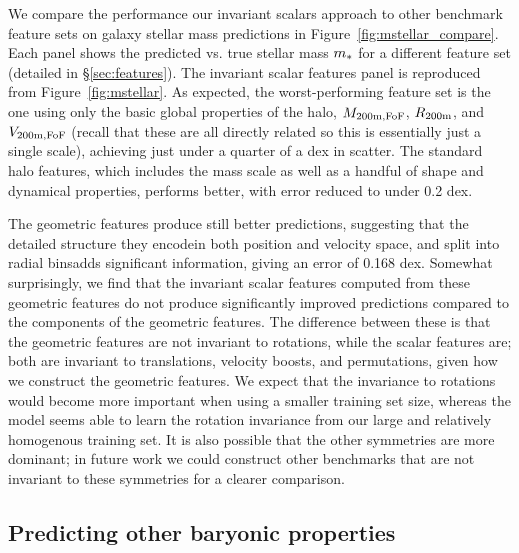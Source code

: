 We compare the performance our invariant scalars approach to other benchmark feature sets on galaxy stellar mass predictions in Figure~\ref{fig:mstellar_compare}.
Each panel shows the predicted vs. true stellar mass $m_*$ for a different feature set (detailed in \S\ref{sec:features}).
The invariant scalar features panel is reproduced from Figure~\ref{fig:mstellar}.
As expected, the worst-performing feature set is the one using only the basic global properties of the halo, $M_\mathrm{200m,FoF}$, $R_\mathrm{200m}$, and $V_\mathrm{200m,FoF}$ (recall that these are all directly related so this is essentially just a single scale), achieving just under a quarter of a dex in scatter.
The standard halo features, which includes the mass scale as well as a handful of shape and dynamical properties, performs better, with error reduced to under 0.2 dex. 

The geometric features produce still better predictions, suggesting that the detailed structure they encode{\emdash}in both position and velocity space, and split into radial bins{\emdash}adds significant information, giving an error of 0.168 dex.
Somewhat surprisingly, we find that the invariant scalar features computed from these geometric features do not produce significantly improved predictions compared to the components of the geometric features.
The difference between these is that the geometric features are not invariant to rotations, while the scalar features are; both are invariant to translations, velocity boosts, and permutations, given how we construct the geometric features.
We expect that the invariance to rotations would become more important when using a smaller training set size, whereas the model seems able to learn the rotation invariance from our large and relatively homogenous training set.
It is also possible that the other symmetries are more dominant; in future work we could construct other benchmarks that are not invariant to these symmetries for a clearer comparison.


\subsection{Predicting other baryonic properties}
\label{sec:pred_galprops}

